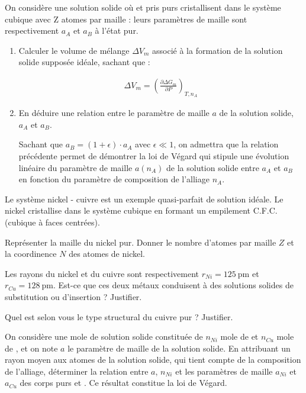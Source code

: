 \Q On considère une solution solide où  et  pris purs cristallisent dans le système cubique avec Z atomes par maille : leurs paramètres de maille sont respectivement $a_A$ et $a_B$ à l'état
pur.
\begin{enumerate}
\item Calculer le volume de mélange $\Delta V_m$ associé à la formation de la solution solide supposée idéale, sachant que : 

\begin{align*}
	\Delta V_m = \left( \frac{\partial \Delta G_m}{\partial P} \right)_{T, n_A}
\end{align*}

\item En déduire une relation entre le paramètre de maille $a$ de la solution solide, $a_A$ et $a_B$.

Sachant que $a_B = (1+\epsilon) \cdot a_A$ avec $\epsilon \ll 1$, on admettra que la relation précédente permet de démontrer la loi de Végard qui stipule une évolution linéaire du paramètre de maille $a(n_A)$ de la solution solide entre $a_A$ et $a_B$ en fonction du paramètre de composition de l'alliage $n_A$.

\end{enumerate}

Le système nickel - cuivre est un exemple quasi-parfait de solution idéale. Le nickel cristallise dans le système cubique en formant un empilement C.F.C. (cubique à faces centrées).

\Q Représenter la maille du nickel pur. Donner le nombre d'atomes par maille $Z$ et la coordinence $N$ des atomes de nickel.

Les rayons du nickel et du cuivre sont respectivement $r_{Ni} = 125 ~ \si{\pico\meter}$ et $r_{Cu} = 128 ~ \si{\pico\meter}$. Est-ce que ces deux métaux conduisent à des solutions solides de substitution ou d'insertion ? Justifier.

\Q Quel est selon vous le type structural du cuivre pur ? Justifier.

\Q On considère une mole de solution solide constituée de $n_{Ni}$ mole de  et $n_{Cu}$ mole de , et on note $a$ le paramètre de maille de la solution solide. En attribuant un rayon moyen aux atomes de la solution solide, qui tient compte de la composition de l'alliage, déterminer la relation entre $a$, $n_{Ni}$ et les paramètres de maille $a_{Ni}$ et $a_{Cu}$ des corps purs  et . Ce résultat constitue la loi de Végard.
